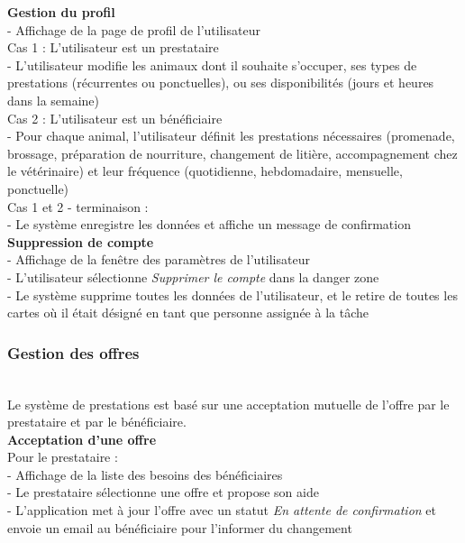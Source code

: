 \documentclass[conference]{IEEEtran}
\begin{document}
\textbf{Gestion du profil}\\
- Affichage de la page de profil de l'utilisateur\\

Cas 1 : L'utilisateur est un prestataire\\
- L'utilisateur modifie les animaux dont il souhaite s'occuper, ses types de prestations (récurrentes ou ponctuelles), ou ses disponibilités (jours et heures dans la semaine)\\

Cas 2 : L'utilisateur est un bénéficiaire\\
- Pour chaque animal, l'utilisateur définit les prestations nécessaires (promenade, brossage, préparation de nourriture, changement de litière, accompagnement chez le vétérinaire) et leur fréquence (quotidienne, hebdomadaire, mensuelle, ponctuelle)\\

Cas 1 et 2 - terminaison :\\
- Le système enregistre les données et affiche un message de confirmation\\

\textbf{Suppression de compte}\\
- Affichage de la fenêtre des paramètres de l'utilisateur\\
- L'utilisateur sélectionne \textit{Supprimer le compte} dans la danger zone\\
- Le système supprime toutes les données de l'utilisateur, et le retire de toutes les cartes où il était désigné en tant que personne assignée à la tâche\\


\subsubsection{Gestion des offres}\hfil\\

Le système de prestations est basé sur une acceptation mutuelle de l'offre par le prestataire et par le bénéficiaire.\\

\textbf{Acceptation d'une offre}\hfil\\
Pour le prestataire :\\
- Affichage de la liste des besoins des bénéficiaires\\
- Le prestataire sélectionne une offre et propose son aide\\
- L'application met à jour l'offre avec un statut \textit{En attente de confirmation} et envoie un email au bénéficiaire pour l'informer du changement\\
\end{document}
